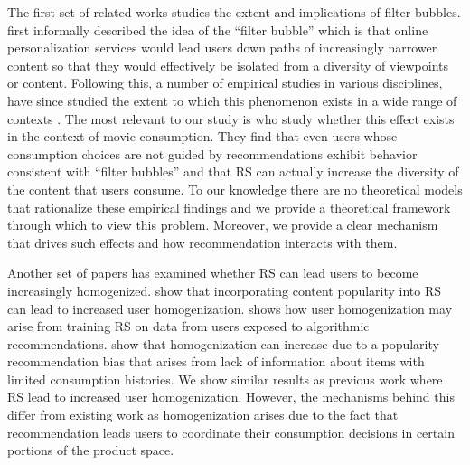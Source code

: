 \documentclass[manuscript]{acmart}
\newcommand{\xhdr}[1]{\vspace{1mm} \noindent{\bf #1}}
\begin{document}
\par
\xhdr{Related Work.} 
The first set of related works studies the extent and implications of filter bubbles. \cite{pariser2011filter} first informally described the idea of the ``filter bubble'' which is that online personalization services would lead users down paths of increasingly narrower content so that they would effectively be isolated from a diversity of viewpoints or content. Following this, a number of empirical studies in various disciplines, have since studied the extent to which this phenomenon exists in a wide range of contexts \cite{flaxman2016filter,hosanagar2013will,moller2018blame,nguyen2014exploring}. The most relevant to our study is \cite{nguyen2014exploring} who study whether this effect exists in the context of movie consumption. They find that even users whose consumption choices are not guided by recommendations exhibit behavior consistent with ``filter bubbles'' and that RS can actually increase the diversity of the content that users consume. To our knowledge there are no theoretical models that rationalize these empirical findings and we provide a theoretical framework through which to view this problem. Moreover, we provide a clear mechanism that drives such effects and how recommendation interacts with them.
\par 
Another set of papers has examined whether RS can lead users to become increasingly homogenized. \cite{celma2008hits, treviranus2009value} show that incorporating content popularity into RS can lead to increased user homogenization. \cite{chaney2018algorithmic} shows how user homogenization may arise from training RS on data from users exposed to algorithmic recommendations. \cite{fleder2009blockbuster} show that homogenization can increase due to a popularity recommendation bias that arises from lack of information about items with limited consumption histories. We show similar results as previous work where RS lead to increased user homogenization. However, the mechanisms behind this differ from existing work as homogenization arises due to the fact that recommendation leads users to coordinate their consumption decisions in certain portions of the product space.
\par
\end{document}
